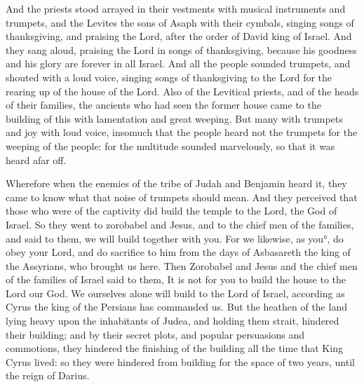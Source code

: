 {And the priests stood arrayed in their vestments with musical instruments and trumpets, and the Levites the sons of Asaph with their cymbals,
singing songs of thanksgiving, and praising the Lord, after the order of David king of Israel.
And they sang aloud, praising the Lord in songs of thanksgiving, because his goodness and his glory are forever in all Israel.
And all the people sounded trumpets, and shouted with a loud voice, singing songs of thanksgiving to the Lord for the rearing up of the house of the Lord.
 Also of the Levitical priests, and of the heads of their families, the ancients who had seen the former house came to the building of this with lamentation and great weeping.
But many with trumpets and joy
{} with loud voice,
insomuch that the people heard not the trumpets for the weeping of the people: for the multitude sounded marvelously, so that it was heard afar off.
\par }{\PP {} Wherefore when the enemies of the tribe of Judah and Benjamin heard it, they came to know what that noise of trumpets should mean.
And they perceived that those who were of the captivity did build the temple to the Lord, the God of Israel.
So they went to zorobabel and Jesus, and to the chief men of the families, and said to them, we will build together with you.
For we likewise, as you°, do obey your Lord, and do sacrifice to him from the days of
 Asbasareth the king of the Assyrians, who brought us here.
Then Zorobabel and Jesus and the chief men of the families of Israel said to them, It is not
 for you to build the house to the Lord our God.
We ourselves alone will build to the Lord of Israel, according as Cyrus the king of the Persians has commanded us.
But the heathen of the land lying heavy upon the inhabitants of Judea, and
 holding them strait, hindered their building;
and
 by their secret plots, and popular persuasions and commotions, they hindered the finishing of the building all the time that King Cyrus lived: so they were hindered from building for the space of two years, until the reign of Darius.

}
